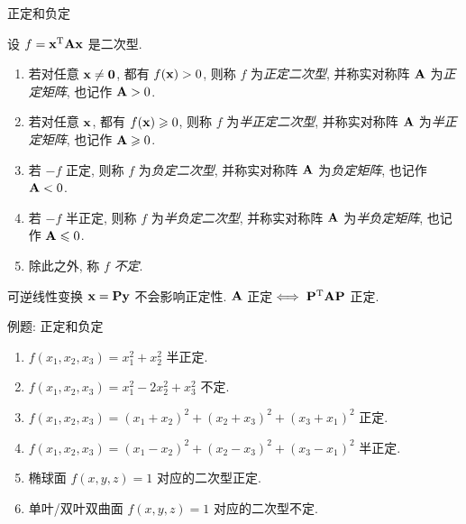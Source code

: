 \begin{frame}{正定和负定}
	\onslide<+->
	\begin{definition}
		设 $f={\mathbf{x}}^{\mathrm{T}}{\mathbf{A}}{\mathbf{x}}$ 是二次型.
		\begin{enumerate}
			\item 若对任意 ${\mathbf{x}}\neq{\bf0}$, 都有 $f({\mathbf{x}})>0$, 则称 $f$ 为\emph{正定二次型}, 并称实对称阵 ${\mathbf{A}}$ 为\emph{正定矩阵}, 也记作 ${\mathbf{A}}>0$.
			\item 若对任意 ${\mathbf{x}}$, 都有 $f({\mathbf{x}})\geqslant0$, 则称 $f$ 为\emph{半正定二次型}, 并称实对称阵 ${\mathbf{A}}$ 为\emph{半正定矩阵}, 也记作 ${\mathbf{A}}\geqslant0$.
			\item 若 $-f$ 正定, 则称 $f$ 为\emph{负定二次型}, 并称实对称阵 ${\mathbf{A}}$ 为\emph{负定矩阵}, 也记作 ${\mathbf{A}}<0$.
			\item 若 $-f$ 半正定, 则称 $f$ 为\emph{半负定二次型}, 并称实对称阵 ${\mathbf{A}}$ 为\emph{半负定矩阵}, 也记作 ${\mathbf{A}}\leqslant0$.
			\item 除此之外, 称 $f$ \emph{不定}.
		\end{enumerate}
	\end{definition}
	\onslide<+->
	可逆线性变换 ${\mathbf{x}}={\mathbf{P}}{\mathbf{y}}$ 不会影响正定性.
	\onslide<+->
	${\mathbf{A}}$ 正定$\iff {\mathbf{P}}^{\mathrm{T}}{\mathbf{A}}{\mathbf{P}}$ 正定.
\end{frame}


\begin{frame}{例题: 正定和负定}
	\onslide<+->
	\begin{example}
		\begin{enumerate}
			\item $f(x_1,x_2,x_3)=x_1^2+x_2^2$ 半正定.
			\item $f(x_1,x_2,x_3)=x_1^2-2x_2^2+x_3^2$ 不定.
			\item $f(x_1,x_2,x_3)=(x_1+x_2)^2+(x_2+x_3)^2+(x_3+x_1)^2$ 正定.
			\item $f(x_1,x_2,x_3)=(x_1-x_2)^2+(x_2-x_3)^2+(x_3-x_1)^2$ 半正定.
			\item 椭球面 $f(x,y,z)=1$ 对应的二次型正定.
			\item 单叶/双叶双曲面 $f(x,y,z)=1$ 对应的二次型不定.
		\end{enumerate}
	\end{example}
\end{frame}


